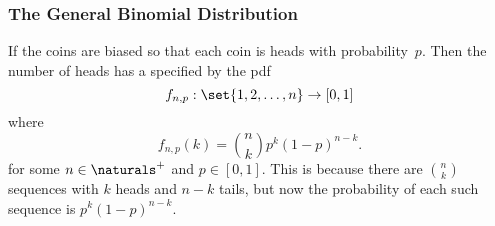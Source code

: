 \subsubsection{The General Binomial Distribution}

  If the coins are biased
so that each coin is heads with probability~$p$.  Then the number of
heads has a  specified by the
pdf
\begin{equation*}
    f_{n,p} : \set{1, 2, \dots, n} \to [0, 1]
\end{equation*}
where
\[
    f_{n, p}(k) = \binom{n}{k} p^k (1-p)^{n-k}.
\]
for some $n \in \naturals^+$ and $p \in [0, 1]$.  This is because
there are $\binom{n}{k}$ sequences with $k$ heads and $n - k$ tails,
but now the probability of each such sequence is $p^k (1-p)^{n-k}$.

